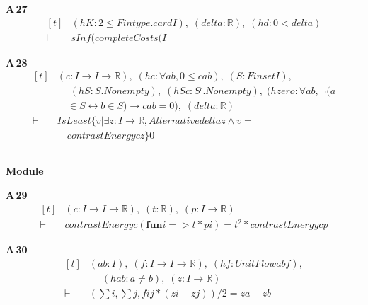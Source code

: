 \noindent\textbf{A\,27}\quad{}
{\footnotesize\[ \begin{aligned}[t]
&(\mathit{hK} : 2 \leq \mathit{Fintype}.\mathit{card} \mathit{I}),\; (\mathit{delta} : \mathbb{R} ),\; (\mathit{hd} : 0<\mathit{delta})\\
\vdash\;&\mathit{sInf} (\mathit{completeCosts} (\mathit{I}
\end{aligned} \]}

\noindent\textbf{A\,28}\quad{}
{\footnotesize\[ \begin{aligned}[t]
&(\mathit{c} : \mathit{I} \to \mathit{I} \to \mathbb{R} ),\; (\mathit{hc} : \forall \mathit{a} \mathit{b},0 \leq \mathit{c} \mathit{a} \mathit{b}),\; (\mathit{S} : \mathit{Finset} \mathit{I}),\\
&\quad \; (\mathit{hS} : \mathit{S}.\mathit{Nonempty}),\; (\mathit{hSc} : \mathit{Sᶜ}.\mathit{Nonempty}),\; (\mathit{hzero} : \forall \mathit{a} \mathit{b},\neg (\mathit{a}\\
&\quad \in \mathit{S} \leftrightarrow \mathit{b} \in \mathit{S}) \to \mathit{c} \mathit{a} \mathit{b}=0),\; (\mathit{delta} : \mathbb{R} )\\
\vdash\;&\mathit{IsLeast} \{ \mathit{v} | \exists \mathit{z} : \mathit{I} \to \mathbb{R} ,\mathit{Alternative} \mathit{delta} \mathit{z} \wedge \mathit{v}=\\
&\quad \mathit{contrastEnergy} \mathit{c} \mathit{z}\} 0
\end{aligned} \]}

\vspace{4pt}\noindent\rule{\columnwidth}{0.4pt}\par\vspace{2pt}
\noindent\textbf{Module }\par\vspace{3pt}

\noindent\textbf{A\,29}\quad{}
{\footnotesize\[ \begin{aligned}[t]
&(\mathit{c} : \mathit{I} \to \mathit{I} \to \mathbb{R} ),\; (\mathit{t} : \mathbb{R} ),\; (\mathit{p} : \mathit{I} \to \mathbb{R} )\\
\vdash\;&\mathit{contrastEnergy} \mathit{c} (\mathbf{fun} \mathit{i} => \mathit{t}*\mathit{p} \mathit{i}) = \mathit{t}^{2}*\mathit{contrastEnergy} \mathit{c} \mathit{p}
\end{aligned} \]}

\noindent\textbf{A\,30}\quad{}
{\footnotesize\[ \begin{aligned}[t]
&(\mathit{a} \mathit{b} : \mathit{I}),\; (\mathit{f} : \mathit{I} \to \mathit{I} \to \mathbb{R} ),\; (\mathit{hf} : \mathit{UnitFlow} \mathit{a} \mathit{b} \mathit{f}),\\
&\quad \; (\mathit{hab} : \mathit{a} \neq \mathit{b}),\; (\mathit{z} : \mathit{I} \to \mathbb{R} )\\
\vdash\;&(\textstyle\sum \mathit{i}, \textstyle\sum \mathit{j}, \mathit{f} \mathit{i} \mathit{j}*(\mathit{z} \mathit{i}-\mathit{z} \mathit{j}))/2 = \mathit{z} \mathit{a}-\mathit{z} \mathit{b}
\end{aligned} \]}


